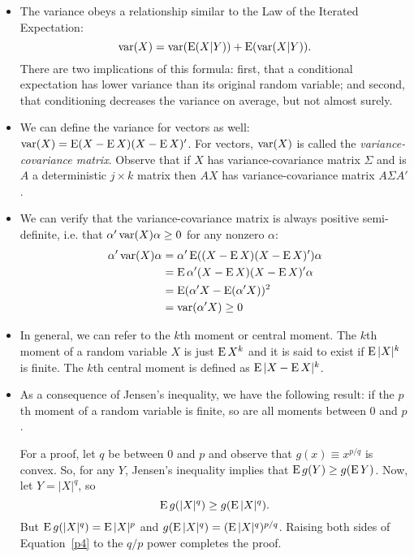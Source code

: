 \begin{itemize}[leftmargin=0pt]
\item The variance obeys a relationship similar to the Law of the
  Iterated Expectation:
  \begin{equation*}
    \operatorname{var}(X) = \operatorname{var}(\operatorname{E}(X|Y)) + \operatorname{E}(\operatorname{var}(X|Y)).
  \end{equation*}
  There are two implications of this formula: first, that a
  conditional expectation has lower variance than its original random
  variable; and second, that conditioning decreases the variance on
  average, but not almost surely.

\item We can define the variance for vectors as well: $\operatorname{var}(X) = \operatorname{E}(X
  - \operatorname{E} X) (X - \operatorname{E} X)'$.  For vectors, $\operatorname{var}(X)$ is called the
  \emph{variance-covariance matrix}.  Observe that if $X$ has
  variance-covariance matrix $\Sigma$ and is $A$ a deterministic $j \times k$
  matrix then $A X$ has variance-covariance matrix $A \Sigma A'$.

\item We can verify that the variance-covariance matrix is always
  positive semi-definite, i.e. that $\alpha'\operatorname{var}(X)\alpha \geq 0$ for any nonzero
  $\alpha$:
  \begin{align*}
    \alpha'\operatorname{var}(X)\alpha &= \alpha' \operatorname{E}((X - \operatorname{E} X)(X - \operatorname{E} X)') \alpha \\
    &= \operatorname{E} \alpha'(X - \operatorname{E} X)(X - \operatorname{E} X)'\alpha \\
    &= \operatorname{E} (\alpha'X - \operatorname{E}(\alpha'X))^2 \\
    &= \operatorname{var}(\alpha'X) \geq 0
  \end{align*}

\item In general, we can refer to the $k$th moment or central moment.
  The $k$th moment of a random variable $X$ is just $\operatorname{E} X^k$ and it is
  said to exist if $\operatorname{E} |X|^k$ is finite.  The $k$th central moment is
  defined as $\operatorname{E} |X - \operatorname{E} X|^k$.

\item As a consequence of Jensen's inequality, we have the following
  result: if the $p$th moment of a random variable is finite, so are
  all moments between 0 and $p$.

  For a proof, let $q$ be between 0 and $p$ and observe that $g(x) \equiv
  x^{p/q}$ is convex.  So, for any $Y$, Jensen's inequality implies
  that $\operatorname{E} g(Y) \geq g(\operatorname{E} Y)$.  Now, let $Y = |X|^q$, so
  \begin{equation}\label{p4}
    \E g(|X|^q) \geq g(\E |X|^q).
  \end{equation}
  But $\operatorname{E} g(|X|^q) = \operatorname{E} |X|^p$ and $g(\operatorname{E} |X|^q) = (\operatorname{E} |X|^q)^{p/q}$.
  Raising both sides of Equation~\eqref{p4} to the $q/p$ power
  completes the proof.


\end{itemize}
